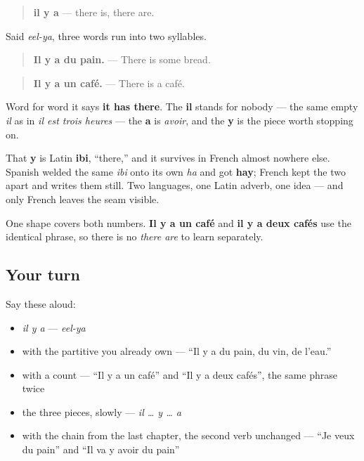 \begin{cousinweb}
\begin{quote}
\textbf{il y a} — there is, there are.
\end{quote}

Said \emph{eel-ya}, three words run into two syllables.

\begin{quote}
\textbf{Il y a du pain.} — There is some bread.
\end{quote}

\begin{quote}
\textbf{Il y a un café.} — There is a café.
\end{quote}

Word for word it says \textbf{it has there}. The \textbf{il} stands for nobody — the same empty \emph{il} as in \emph{il est trois heures} — the \textbf{a} is \emph{avoir}, and the \textbf{y} is the piece worth stopping on.

That \textbf{y} is Latin \textbf{ibi}, \textquotedblleft{}there,\textquotedblright{} and it survives in French almost nowhere else. Spanish welded the same \emph{ibi} onto its own \emph{ha} and got \textbf{hay}; French kept the two apart and writes them still. Two languages, one Latin adverb, one idea — and only French leaves the seam visible.

One shape covers both numbers. \textbf{Il y a un café} and \textbf{il y a deux cafés} use the identical phrase, so there is no \emph{there are} to learn separately.
\end{cousinweb}

\subsection*{Your turn}
Say these aloud:

\begin{itemize}
\raggedright
  \item \emph{il y a} — \emph{eel-ya}
  \item with the partitive you already own — \textquotedblleft{}Il y a du pain, du vin, de l'eau.\textquotedblright{}
  \item with a count — \textquotedblleft{}Il y a un café\textquotedblright{} and \textquotedblleft{}Il y a deux cafés\textquotedblright{}, the same phrase twice
  \item the three pieces, slowly — \emph{il … y … a}
  \item with the chain from the last chapter, the second verb unchanged — \textquotedblleft{}Je veux du pain\textquotedblright{} and \textquotedblleft{}Il va y avoir du pain\textquotedblright{}
\end{itemize}

